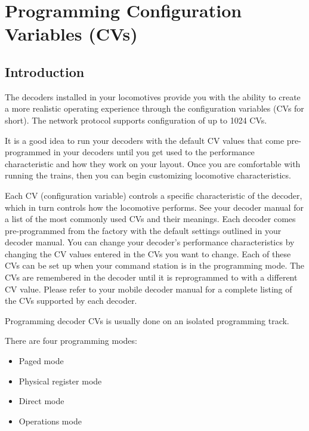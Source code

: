  

\chapter[Configuration Variables]{Programming Configuration Variables (CVs)} 	

\section{Introduction}

The decoders installed in your locomotives provide you with the ability to create a more realistic operating experience through the configuration variables (CVs for short). The network protocol supports configuration of up to
1024 CVs.

It is a good idea to run your decoders with the default CV values that come pre-programmed in your decoders until you get used to the performance characteristic and how they work on your layout. Once you are comfortable with running the trains, then you can begin customizing locomotive characteristics.

Each CV (configuration variable) controls a specific characteristic of the decoder, which in turn controls how the locomotive performs. See your decoder manual for a list of the most commonly used CVs and their meanings.
Each decoder comes pre-programmed from the factory with the default settings outlined in your decoder manual. You can change your decoder’s performance characteristics by changing the CV values entered in the CVs you want to change. Each of these CVs can be set up when your command station is in the programming mode. The CVs are remembered in the decoder until it is reprogrammed to with a different CV value. Please refer to your mobile decoder manual for a complete listing of the CVs supported by each decoder.

Programming decoder CVs is usually done on an isolated programming track.

There are four programming modes:

\begin{itemize}
\item Paged mode
\item Physical register mode
\item Direct mode
\item Operations mode
\end{itemize}

